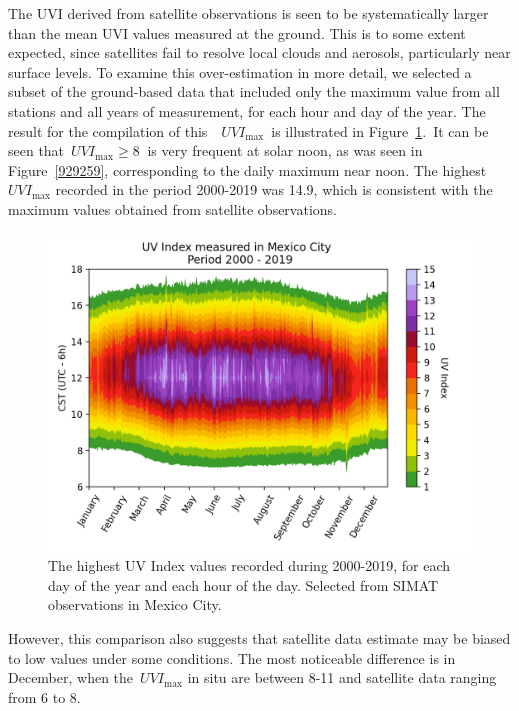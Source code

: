 \documentclass[10pt]{article}
\begin{document}
The UVI derived from satellite observations is seen to be systematically
larger than the mean UVI values measured at the ground. This is to some
extent expected, since satellites fail to resolve local clouds and
aerosols, particularly near surface levels. To examine this
over-estimation in more detail, we selected a subset of the ground-based
data that included only the maximum value from all stations and all
years of measurement, for each hour and day of the year. The result for
the compilation of this~~\(UVI_{\max}\)~is illustrated in
Figure~{\ref{931769}}.~It can be seen
that~\(UVI_{\max}\ge8\ \) is very frequent at solar noon, as was seen in
Figure~{\ref{929259}}, corresponding to the daily
maximum near noon. The highest~\(UVI_{\max}\) recorded in the period
2000-2019 was 14.9, which is consistent with the maximum values obtained
from satellite observations.
\begin{figure}[H]
\begin{center}
\includegraphics[width=0.98\columnwidth]{figures/MaxUVindex}
\caption{{The highest UV Index values recorded during 2000-2019, for each day of
the year and each hour of the day. Selected from SIMAT observations in
Mexico City.~
{\label{931769}}%
}}
\end{center}
\end{figure}

However, this comparison also suggests that satellite data estimate may
be biased to low values under some conditions. The most noticeable
difference is in December, when the~\(UVI_{\max}\) in situ are
between 8-11 and satellite data ranging from 6 to 8.~
\end{document}
